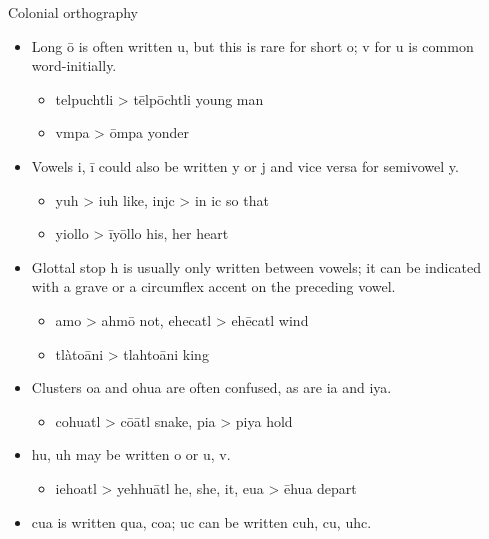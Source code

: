 \documentclass[12pt]{beamer}
\newcommand{\nah}[1]{\textcolor{nahgrn}{#1}}
\newcommand{\trs}[1]{\textcolor{nahblu}{#1}}
\begin{document}
\begin{frame}
\begin{columns}[t]
\begin{column}{.22\linewidth}
\begin{block}{Colonial orthography}
\begin{itemize}
\begin{itemize}
          \end{itemize}
        \item  Long \nah{ō} is often written \nah{u}, but this is rare for short \nah{o}; \nah{v} for \nah{u} is common word-initially.
          \begin{itemize}
          \item \nah{telpuchtli} > \nah{tēlpōchtli} \trs{young man}
          \item \nah{vmpa} > \nah{ōmpa} \trs{yonder}
          \end{itemize}
        \item Vowels \nah{i}, \nah{ī} could also be written \nah{y} or \nah{j} and vice versa for semivowel \nah{y}.
          \begin{itemize}
          \item \nah{yuh} > \nah{iuh} \trs{like}, \nah{injc} > \nah{in ic} \trs{so that}
          \item \nah{yiollo} > \nah{īyōllo} \trs{his, her heart}
          \end{itemize}
        \item Glottal stop \nah{h} is usually only written between vowels; it can be indicated with  a grave or a circumflex accent on the preceding vowel.
          \begin{itemize}
          \item \nah{amo} > \nah{ahmō} \trs{not}, \nah{ehecatl} > \nah{ehēcatl} \trs{wind}
          \item \nah{tlàtoāni} > \nah{tlahtoāni} \trs{king}
          \end{itemize}
        \item Clusters \nah{oa} and \nah{ohua} are often confused, as are \nah{ia} and \nah{iya}.
          \begin{itemize}
          \item \nah{cohuatl} > \nah{cōātl} \trs{snake}, \nah{pia} > \nah{piya} \trs{hold}
          \end{itemize}
        \item \nah{hu, uh} may be written \nah{o} or \nah{u, v}.
          \begin{itemize}
          \item \nah{iehoatl} > \nah{yehhuātl} \trs{he, she, it}, \nah{eua} > \nah{ēhua} \trs{depart}
          \end{itemize}
        \item \nah{cua} is written \nah{qua, coa}; \nah{uc} can be written \nah{cuh, cu, uhc}.
          \begin{itemize}

\end{itemize}
\end{itemize}
\end{block}
\end{column}
\end{columns}
\end{frame}
\end{document}
